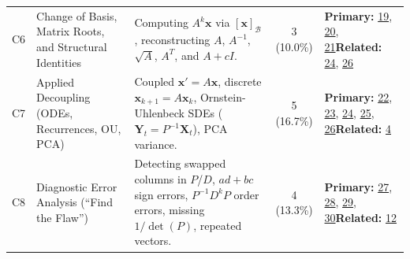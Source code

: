\documentclass[11pt, letterpaper]{article}
\theoremstyle{definition}
\theoremstyle{remark}
\begin{document}
\begin{tabularx}{\textwidth}{l X X c p{3.1cm}}
\addlinespace[3pt]
C6 & Change of Basis, Matrix Roots, and Structural Identities & Computing $A^{k}\mathbf{x}$ via $[\mathbf{x}]_{\mathcal{B}}$, reconstructing $A$, $A^{-1}$, $\sqrt{A}$, $A^{T}$, and $A+cI$. & 3 (10.0\%) & \textbf{Primary:} \hyperref[prob:19]{19}, \hyperref[prob:20]{20}, \hyperref[prob:21]{21}\newline \textbf{Related:} \hyperref[prob:24]{24}, \hyperref[prob:26]{26} \\
\addlinespace[3pt]
C7 & Applied Decoupling (ODEs, Recurrences, OU, PCA) & Coupled $\mathbf{x}' = A\mathbf{x}$, discrete $\mathbf{x}_{k+1}=A\mathbf{x}_k$, Ornstein-Uhlenbeck SDEs ($\mathbf{Y}_t = P^{-1}\mathbf{X}_t$), PCA variance. & 5 (16.7\%) & \textbf{Primary:} \hyperref[prob:22]{22}, \hyperref[prob:23]{23}, \hyperref[prob:24]{24}, \hyperref[prob:25]{25}, \hyperref[prob:26]{26}\newline \textbf{Related:} \hyperref[prob:4]{4} \\
\addlinespace[3pt]
C8 & Diagnostic Error Analysis (``Find the Flaw'') & Detecting swapped columns in $P$/$D$, $ad+bc$ sign errors, $P^{-1}D^{k}P$ order errors, missing $1/\det(P)$, repeated vectors. & 4 (13.3\%) & \textbf{Primary:} \hyperref[prob:27]{27}, \hyperref[prob:28]{28}, \hyperref[prob:29]{29}, \hyperref[prob:30]{30}\newline \textbf{Related:} \hyperref[prob:12]{12} \\
\bottomrule
\end{tabularx}
\end{document}
